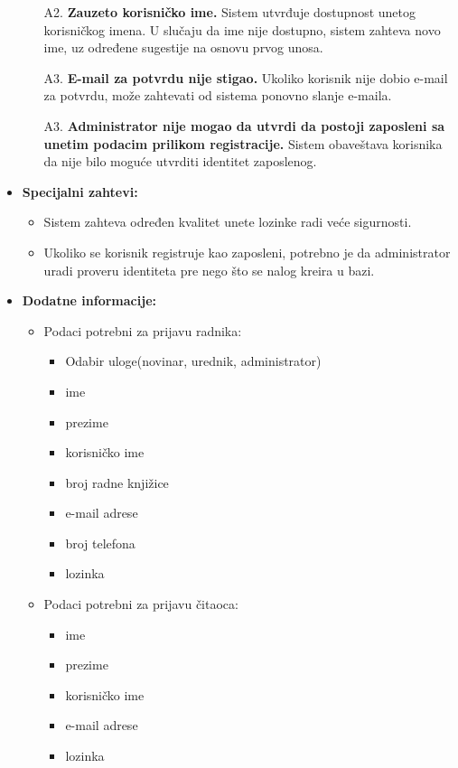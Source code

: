 \documentclass{article}
\begin{document}
\begin{itemize}
\begin{itemize}
            \item[A2.] \textbf{Zauzeto korisničko ime.} Sistem utvrđuje dostupnost unetog korisničkog imena. U slučaju da ime nije dostupno, sistem zahteva novo ime, uz određene sugestije na osnovu prvog unosa.
            \item[A3.] \textbf{E-mail za potvrdu nije stigao.} Ukoliko korisnik nije dobio e-mail za potvrdu, može zahtevati od sistema ponovno slanje e-maila.
             \item[A3.] \textbf{Administrator nije mogao da utvrdi da postoji zaposleni sa unetim podacim prilikom registracije.}
             Sistem obaveštava korisnika da nije bilo moguće utvrditi identitet zaposlenog.
        \end{itemize}
    \item \textbf{Specijalni zahtevi:}
        \begin{itemize}
			\item Sistem zahteva određen kvalitet unete lozinke radi veće sigurnosti.
			\item Ukoliko se korisnik registruje kao zaposleni, potrebno je da administrator uradi proveru identiteta pre nego što se nalog kreira u bazi.
		\end{itemize}
	\item \textbf{Dodatne informacije:}
        \begin{itemize}
            \item  Podaci potrebni za prijavu radnika:
                \begin{itemize}
                    \item Odabir uloge(novinar, urednik, administrator)
                    \item ime
                    \item prezime
                    \item korisničko ime
                    \item broj radne knjižice
                    \item e-mail adrese
                    \item broj telefona
                    \item lozinka
                \end{itemize}
             \item  Podaci potrebni za prijavu čitaoca:
                \begin{itemize}
                    \item ime
                    \item prezime
                    \item korisničko ime
                    \item e-mail adrese
                    \item lozinka
                \end{itemize}
        \end{itemize}
\end{itemize}
\end{document}
